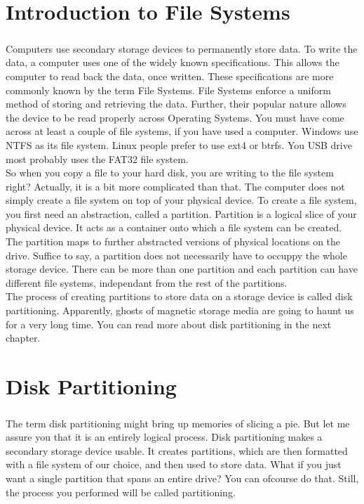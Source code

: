 \chapter{Introduction to File Systems}
\paragraph{}
Computers use secondary storage devices to permanently store data. To write the
data, a computer uses one of the widely known specifications. This allows the
computer to read back the data, once written. These specifications are more
commonly known by the term File Systems. File Systems enforce a uniform method
of storing and retrieving the data. Further, their popular nature allows the
device to be read properly across Operating Systems. You must have come across
at least a couple of file systems, if you have used a computer. Windows use NTFS
as its file system. Linux people prefer to use ext4 or btrfs. You USB drive most
probably uses the FAT32 file system.\\

So when you copy a file to your hard disk, you are writing to the file system
right? Actually, it is a bit more complicated than that. The computer does not
simply create a file system on top of your physical device. To create a file
system, you first need an abstraction, called a partition. Partition is a
logical slice of your physical device. It acts as a container onto which a file
system can be created. The partition maps to further abstracted versions of
physical locations on the drive. Suffice to say, a partition does not
necessarily have to occuppy the whole storage device. There can be more than one
partition and each partition can have different file systems, independant from
the rest of the partitions.\\

The process of creating partitions to store data on a storage device is called
disk partitioning. Apparently, ghosts of magnetic storage media are going to
haunt us for a very long time. You can read more about disk partitioning in the
next chapter.


\chapter{Disk Partitioning}
\paragraph{}
The term disk partitioning might bring up memories of slicing a pie. But let me
assure you that it is an entirely logical process. Disk partitioning makes a
secondary storage device usable. It creates partitions, which are then formatted
with a file system of our choice, and then used to store data. What if you just
want a single partition that spans an entire drive? You can ofcourse do that.
Still, the process you performed will be called partitioning.\\

